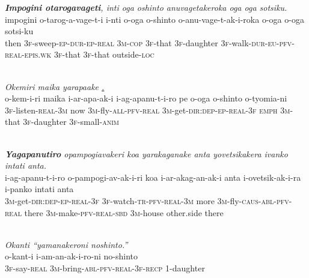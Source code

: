 \documentclass[output=paper]{LSP/langsci}
\begin{document}
\begin{exe}
 \label{Emapp17}
\glt \textit{\textbf{Impogini otarogavageti}, inti oga oshinto anuvagetakeroka oga oga sotsiku.}\\
\gll impogini o-tarog-a-vage-t-i i-nti o-oga o-shinto o-anu-vage-t-ak-i-roka o-oga o-oga sotsi-ku\\
 then \textsc{3f-}sweep\textsc{{}-ep-dur-ep-real} \textsc{3m-cop} \textsc{3f-}that \textsc{3f-}daughter \textsc{3f-}walk\textsc{{}-dur-eu-pfv-real-epis.wk} \textsc{3f-}that \textsc{3f-}that outside\textsc{{}-loc}\\
\glt {}\\
\end{exe}
 
\begin{exe}
 \label{Emapp18}
\glt \textit{Okemiri maika yarapaake \underline{.}}\\
\gll o-kem-i-ri maika i-ar-apa-ak-i i-ag-apanu-t-i-ro pe o-oga o-shinto o-tyomia-ni \\
 \textsc{3f-}listen\textsc{{}-real-3m} now \textsc{3m-}fly\textsc{{}-all-pfv-real} \textsc{3m-}get\textsc{{}-dir:dep-ep-real-3f} \textsc{emph} \textsc{3m-}that \textsc{3f-}daughter \textsc{3f-}small\textsc{{}-anim}\\
\glt {}\\
\end{exe}
 
\begin{exe}
 \label{Emapp19}
\glt \textit{\textbf{Yagapanutiro} opampogiavakeri koa yarakaganake anta yovetsikakera ivanko intati anta.}\\
\gll i-ag-apanu-t-i-ro o-pampogi-av-ak-i-ri koa i-ar-akag-an-ak-i anta i-ovetsik-ak-i-ra i-panko intati anta\\
 \textsc{3m-}get\textsc{{}-dir:dep-ep-real-3f} \textsc{3f-}watch\textsc{{}-tr-pfv-real-3m} more \textsc{3m-}fly\textsc{{}-caus-abl-pfv-real} there \textsc{3m-}make\textsc{{}-pfv-real-sbd} \textsc{3m-}house other.side there\\
\glt {}\\
\end{exe}
 
\begin{exe}
 \label{Emapp20}
\glt \textit{Okanti ``yamanakeroni noshinto.''}\\
\gll o-kant-i i-am-an-ak-i-ro-ni no-shinto\\
 \textsc{3f-}say\textsc{{}-real} \textsc{3m-}bring\textsc{{}-abl-pfv-real-3f-recp} 1-daughter\\
\glt {}\\
\end{exe}
 
\end{document}
